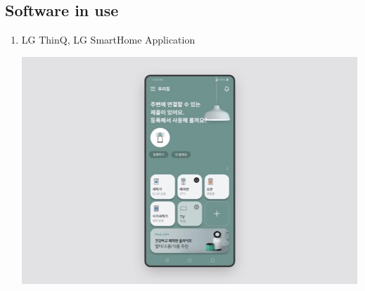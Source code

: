 \documentclass[conference]{IEEEtran}
\begin{document}
\subsection{Software in use}
\begin{enumerate}
    \item LG ThinQ, LG SmartHome Application\\
    \centerline{\includegraphics[scale=0.30]{assets/thinkq.jpg}}


\end{enumerate}
\end{document}
